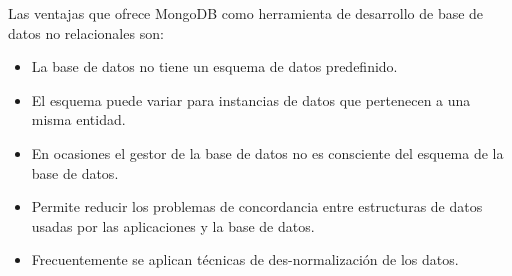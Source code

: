 \documentclass[12pt, a4paper, titlepage]{report}
\begin{document}
		   	Las ventajas que ofrece MongoDB como herramienta de desarrollo de base de datos no relacionales son:
		   	\begin{itemize}
		   		\item La base de datos no tiene un esquema de datos predefinido.
		   		\item El esquema puede variar para instancias de datos que pertenecen a una misma entidad.
		   		\item En ocasiones el gestor de la base de datos no es consciente del esquema de la base de datos.
		   		\item Permite reducir los problemas de concordancia entre estructuras de datos usadas por las aplicaciones y la base de datos.
		   		\item Frecuentemente se aplican técnicas de des-normalización de los datos.
		   	\end{itemize}
\end{document}
